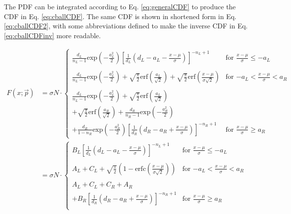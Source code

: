 The PDF can be integrated according to Eq. \eqref{eq:generalCDF} to produce the CDF in Eq. \eqref{eq:cballCDF}. The same CDF is shown in shortened form in Eq. \eqref{eq:cballCDF2}, with some abbreviations defined to make the inverse CDF in Eq. \eqref{eq:cballCDFinv} more readable.

\begin{align}
F(x;\vec{p}) &= \sigma N \cdot \begin{cases}
\frac{d_{L}}{n_{L}-1}\text{exp}\left(-\frac{a_{L}^2}{2}\right) \left[\frac{1}{d_{L}}\left(d_{L}-a_{L}-\frac{x-\mu}{\sigma}\right)\right]^{-n_{L}+1} & \text{for $\frac{x-\mu}{\sigma} \leq -a_{L}$} \\
\\
\frac{d_{L}}{n_{L}-1}\text{exp}\left(-\frac{a_{L}^2}{2}\right) + \sqrt{\frac{\pi}{2}}\text{erf}\left(\frac{a_{L}}{\sqrt{2}}\right) + \sqrt{\frac{\pi}{2}}\text{erf}\left(\frac{x-\mu}{\sigma \sqrt{2}}\right) & \text{for $-a_{L} < \frac{x-\mu}{\sigma} < a_{R}$} \\
\\
\frac{d_{L}}{n_{L}-1}\text{exp}\left(-\frac{a_{L}^2}{2}\right) + \sqrt{\frac{\pi}{2}}\text{erf}\left(\frac{a_{L}}{\sqrt{2}}\right)\\
 + \sqrt{\frac{\pi}{2}}\text{erf}\left(\frac{a_{R}}{\sqrt{2}}\right) + \frac{d_{R}}{n_{R}-1}\text{exp}\left(-\frac{a_{R}^2}{2}\right) \\
 + \frac{d_{R}}{1-n_{R}}\text{exp}\left(-\frac{a_{R}^2}{2}\right) \left[\frac{1}{d_{R}}\left(d_{R}-a_{R}+\frac{x-\mu}{\sigma}\right)\right]^{-n_{R}+1} & \text{for $\frac{x-\mu}{\sigma} \geq a_{R}$}
\end{cases}\label{eq:cballCDF}\\
 &= \sigma N \cdot \begin{cases}
B_{L} \left[\frac{1}{d_{L}}\left(d_{L}-a_{L}-\frac{x-\mu}{\sigma}\right)\right]^{-n_{L}+1} & \text{for $\frac{x-\mu}{\sigma} \leq -a_{L}$} \\
\\
A_{L} + C_{L} + \sqrt{\frac{\pi}{2}}\left(1-\text{erfc}\left(\frac{x-\mu}{\sigma \sqrt{2}}\right)\right) & \text{for $-a_{L} < \frac{x-\mu}{\sigma} < a_{R}$} \\
\\
A_{L} + C_{L} + C_{R} + A_{R} \\
 + B_{R} \left[\frac{1}{d_{R}}\left(d_{R}-a_{R}+\frac{x-\mu}{\sigma}\right)\right]^{-n_{R}+1} & \text{for $\frac{x-\mu}{\sigma} \geq a_{R}$} \\
\end{cases}\label{eq:cballCDF2}
\end{align}

